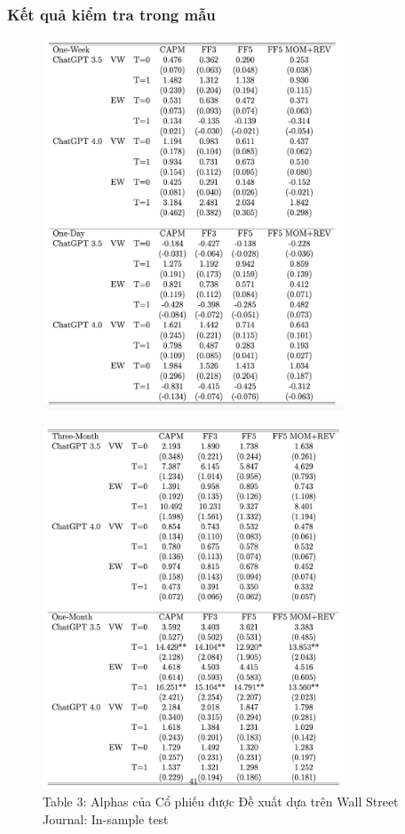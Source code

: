 \documentclass[a4paper,12pt]{article}
\begin{document}
\subsubsection{Kết quả kiểm tra trong mẫu}
\begin{figure}[H]
    \centering
    \includegraphics[width=0.8\textwidth]{table/tab3b.png}
\end{figure}
\begin{figure}[H]
    \centering
    \includegraphics[width=0.8\textwidth]{table/tab3a.png}
    \caption*{Table 3: Alphas của Cổ phiếu được Đề xuất dựa trên Wall Street Journal: In-sample test}
\end{figure}
\end{document}
